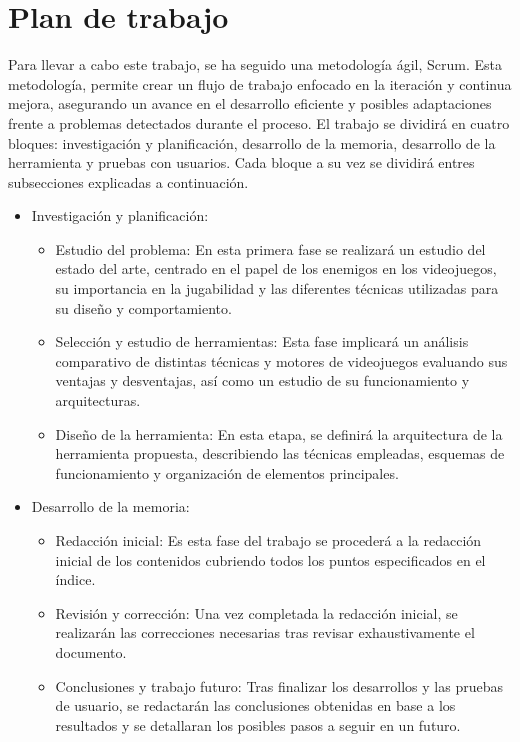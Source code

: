 \section{Plan de trabajo}
Para llevar a cabo este trabajo, se ha seguido una metodología ágil, Scrum. Esta metodología, permite crear un flujo de trabajo enfocado en la iteración y continua mejora, asegurando un avance en el desarrollo eficiente y posibles adaptaciones frente a problemas detectados durante el proceso. 
El trabajo se dividirá en cuatro bloques: investigación y planificación, desarrollo de la memoria, desarrollo de la herramienta y pruebas con usuarios.
Cada bloque a su vez se dividirá entres subsecciones explicadas a continuación.
\begin{itemize}
    \item  Investigación y planificación:
	\begin{itemize}
	    \item  Estudio del problema: En esta primera fase se realizará un estudio del estado del arte, centrado en el papel de los enemigos en los videojuegos, su importancia en la jugabilidad y las diferentes técnicas utilizadas para su diseño y comportamiento.
	    \item Selección y estudio de herramientas: Esta fase implicará un análisis comparativo de distintas técnicas y motores de videojuegos evaluando sus ventajas y desventajas, así como un estudio de su funcionamiento y  arquitecturas.
	    \item Diseño de la herramienta: En esta etapa, se definirá la arquitectura de la herramienta propuesta, describiendo las técnicas empleadas, esquemas de funcionamiento y organización de elementos principales.
	\end{itemize}
  \item Desarrollo de la memoria: 
	\begin{itemize}
	    \item  Redacción inicial: Es esta fase del trabajo se procederá a la redacción inicial de los contenidos cubriendo todos los puntos especificados en el índice.
	    \item Revisión y corrección: Una vez completada la redacción inicial, se realizarán las correcciones necesarias tras revisar exhaustivamente el documento.
	    \item Conclusiones y trabajo futuro: Tras finalizar los desarrollos y las pruebas de usuario, se redactarán las conclusiones obtenidas en base a los resultados y se detallaran los posibles pasos a seguir en un futuro.
	\end{itemize}

\end{itemize}
